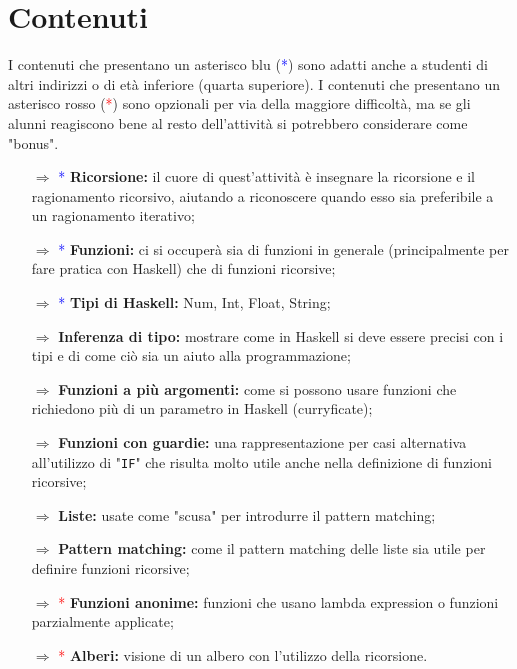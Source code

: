 \paragraph{}


\section{Contenuti}

I contenuti che presentano un asterisco blu (\textcolor{blue}{*}) sono
adatti anche a studenti di altri indirizzi o di età inferiore (quarta superiore). I contenuti che presentano un asterisco rosso (\textcolor{red}{*}) sono
opzionali per via della maggiore difficoltà, ma se gli alunni reagiscono bene al resto dell'attività
si potrebbero considerare come "bonus".

\begin{itemize}
    \item [$\Rightarrow$] \textcolor{blue}{*} \textbf{Ricorsione:} il cuore di quest'attività è insegnare la ricorsione e il
    ragionamento ricorsivo, aiutando a riconoscere quando esso sia preferibile a un ragionamento iterativo;
    \item [$\Rightarrow$] \textcolor{blue}{*} \textbf{Funzioni:} ci si occuperà sia di funzioni in generale (principalmente per fare pratica con Haskell)
    che di funzioni ricorsive;
    \item [$\Rightarrow$] \textcolor{blue}{*} \textbf{Tipi di Haskell:} Num, Int, Float, String;
    \item [$\Rightarrow$] \textbf{Inferenza di tipo:} mostrare come in Haskell si deve essere precisi con i tipi e di come ciò sia un aiuto alla programmazione;
    \item [$\Rightarrow$] \textbf{Funzioni a più argomenti:} come si possono usare funzioni che richiedono più di un parametro in Haskell (curryficate);
    \item [$\Rightarrow$] \textbf{Funzioni con guardie:} una rappresentazione per casi alternativa all'utilizzo di "\texttt{IF}" che risulta molto utile
    anche nella definizione di funzioni ricorsive;
    \item [$\Rightarrow$] \textbf{Liste:} usate come "scusa" per introdurre il pattern matching;
    \item [$\Rightarrow$] \textbf{Pattern matching:} come il pattern matching delle liste sia utile per definire funzioni ricorsive;
    \item [$\Rightarrow$] \textcolor{red}{*} \textbf{Funzioni anonime:} funzioni che usano lambda expression o funzioni parzialmente applicate;
    \item [$\Rightarrow$] \textcolor{red}{*} \textbf{Alberi:} visione di un albero con l'utilizzo della ricorsione.
\end{itemize}

